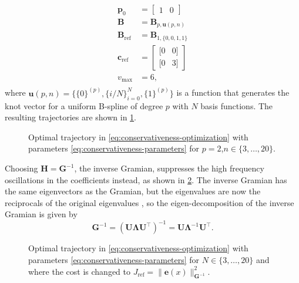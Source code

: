\begin{equation}\label{eq:conservativeness-parameters}
    \begin{aligned}
        \mathbf p_0 &= \begin{bmatrix} 1 & 0 \end{bmatrix} \\
        \mathbf B &= \mathbf B_{p, \mathbf u(p,n)} \\
        \mathbf B_\text{ref} &= \mathbf B_{1,\{0, 0, 1, 1\}} \\
        \mathbf c_\text{ref} &= \begin{bmatrix}
            [0 & 0] \\
            [0 & 3]
        \end{bmatrix} \\
        v_\text{max} &= 6, \\
    \end{aligned}
\end{equation}
where $\mathbf u(p,n) = \{\{0\}^{(p)}, \{i/N\}_{i=0}^{N}, \{1\}^{(p)}\}$ is a function that generates the knot vector for a uniform B-spline of degree $p$ with $N$ basis functions. The resulting trajectories are shown in \cref{fig:conservativeness-traj-integral}.

\begin{figure}
    
    \caption{Optimal trajectory in \cref{eq:conservativeness-optimization} with parameters \cref{eq:conservativeness-parameters} for $p=2$,$n\in\{3,\ldots,20\}$.}
    \label{fig:conservativeness-traj-integral}
\end{figure}

Choosing $\mathbf H = \mathbf G^{-1}$, the inverse Gramian, suppresses the high frequency oscillations in the coefficients instead, as shown in \cref{fig:conservativeness-traj-inv-gramian}.  
The inverse Gramian has the same eigenvectors as the Gramian, but the eigenvalues are now the reciprocals of the original eigenvalues \citep{horn2013positive}, so the eigen-decomposition of the inverse Gramian is given by
\begin{equation}
    \mathbf G^{-1} = \left(\mathbf U \mathbf \Lambda \mathbf U^\top\right)^{-1} = \mathbf U \mathbf \Lambda^{-1} \mathbf U^\top.
\end{equation}

\begin{figure}
    \centering
    
    \caption{Optimal trajectory in \cref{eq:conservativeness-optimization} with parameters \cref{eq:conservativeness-parameters} for $N\in\{3,\ldots,20\}$ and where the cost is changed to $J_\text{ref} = \|\mathbf e(x)\|_{\mathbf G^{-1}}^2$.}
    \label{fig:conservativeness-traj-inv-gramian}
\end{figure}


